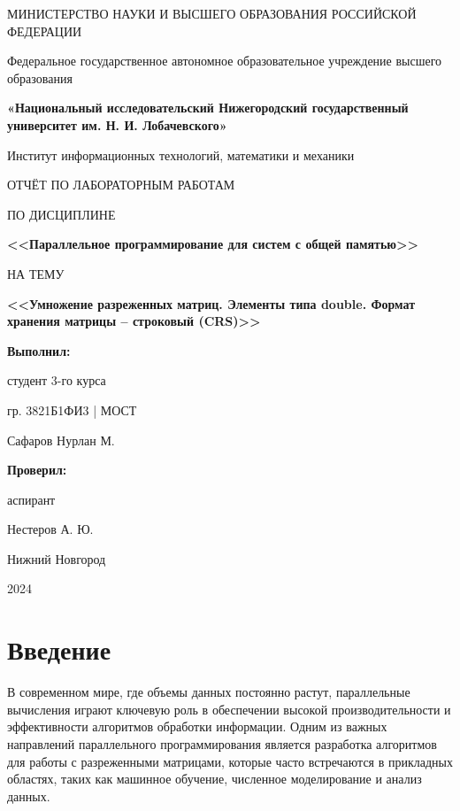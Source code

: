 \documentclass[a4paper, 14pt]{article}
\newcommand{\n}{\par}
\theoremstyle{plain}
\begin{document}
\thispagestyle{empty}
	\begin{center}

МИНИСТЕРСТВО НАУКИ И ВЫСШЕГО ОБРАЗОВАНИЯ РОССИЙСКОЙ ФЕДЕРАЦИИ\n
Федеральное государственное автономное образовательное учреждение высшего образования\n
\textbf{«Национальный исследовательский Нижегородский государственный университет им. Н. И. Лобачевского»}\n
Институт информационных технологий, математики и механики
\vspace{1cm}

ОТЧЁТ ПО ЛАБОРАТОРНЫМ РАБОТАМ

ПО ДИСЦИПЛИНЕ

\textbf{<<Параллельное программирование для систем с общей памятью>>}

НА ТЕМУ

\textbf{<<Умножение разреженных матриц. Элементы типа double. Формат хранения матрицы – строковый (CRS)>>}
\end{center}
\vspace{0.3cm}
\begin{flushright}
	
	\textbf{Выполнил:}
	
	студент 3-го курса 
	
	гр. 3821Б1ФИ3 | МОСТ
	
	Сафаров Нурлан М.
\end{flushright}

\begin{flushright}
	\textbf{Проверил:}
	
	аспирант
	
	Нестеров А. Ю.
\end{flushright}

\begin{center}
\vfill
Нижний Новгород

2024
\end{center}
\newpage
\begin{center}\tableofcontents\end{center}
\newpage
\section*{\centering \textbf{Введение}}

В современном мире, где объемы данных постоянно растут, параллельные вычисления играют ключевую роль в обеспечении высокой производительности и эффективности алгоритмов обработки информации. Одним из важных направлений параллельного программирования является разработка алгоритмов для работы с разреженными матрицами, которые часто встречаются в прикладных областях, таких как машинное обучение, численное моделирование и анализ данных.
\end{document}
